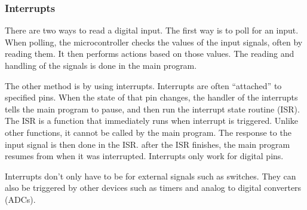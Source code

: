 \documentclass[12pt]{article}
\begin{document}
\subsubsection{Interrupts}

There are two ways to read a digital input. The first way is to poll for an input. When polling, the microcontroller checks the values of the input signals, often by reading them. It then performs actions based on those values. The reading and handling of the signals is done in the main program.

The other method is by using interrupts. Interrupts are often ``attached'' to specified pins. When the state of that pin changes, the handler of the interrupts tells the main program to pause, and then run the interrupt state routine (ISR). The ISR is a function that immediately runs when interrupt is triggered. Unlike other functions, it cannot be called by the main program. The response to the input signal is then done in the ISR. after the ISR finishes, the main program resumes from when it was interrupted. Interrupts only work for digital pins.

Interrupts don't only have to be for external signals such as switches. They can also be triggered by other devices such as timers and analog to digital converters (ADCs). 
\end{document}
